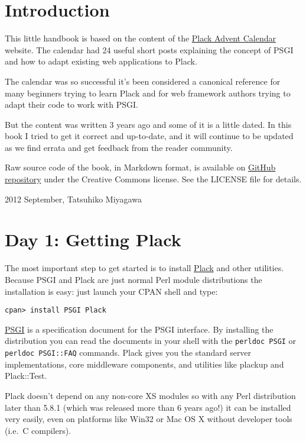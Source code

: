 \section{Introduction}\label{introduction}

This little handbook is based on the content of the
\href{http://advent.plackperl.org/}{Plack Advent Calendar} website. The
calendar had 24 useful short posts explaining the concept of PSGI and
how to adapt existing web applications to Plack.

The calendar was so successful it's been considered a canonical
reference for many beginners trying to learn Plack and for web framework
authors trying to adapt their code to work with PSGI.

But the content was written 3 years ago and some of it is a little
dated. In this book I tried to get it correct and up-to-date, and it
will continue to be updated as we find errata and get feedback from the
reader community.

Raw source code of the book, in Markdown format, is available on
\href{https://github.com/miyagawa/plack-handbook}{GitHub repository}
under the Creative Commons license. See the LICENSE file for details.

2012 September, Tatsuhiko Miyagawa

\section{Day 1: Getting Plack}\label{day-1-getting-plack}

The most important step to get started is to install
\href{http://search.cpan.org/dist/Plack}{Plack} and other utilities.
Because PSGI and Plack are just normal Perl module distributions the
installation is easy: just launch your CPAN shell and type:

\begin{lstlisting}
cpan> install PSGI Plack
\end{lstlisting}

\href{http://search.cpan.org/dist/PSGI}{PSGI} is a specification
document for the PSGI interface. By installing the distribution you can
read the documents in your shell with the \lstinline!perldoc PSGI! or
\lstinline!perldoc PSGI::FAQ! commands. Plack gives you the standard
server implementations, core middleware components, and utilities like
plackup and Plack::Test.

Plack doesn't depend on any non-core XS modules so with any Perl
distribution later than 5.8.1 (which was released more than 6 years
ago!) it can be installed very easily, even on platforms like Win32 or
Mac OS X without developer tools (i.e.~C compilers).

